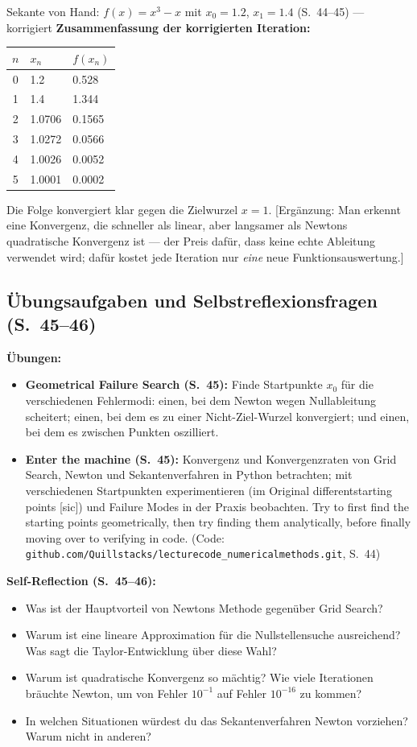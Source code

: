 \begin{bspbox}{Sekante von Hand: $f(x) = x^3 - x$ mit $x_0 = 1.2$, $x_1 = 1.4$ (S.~44--45) — korrigiert}
\textbf{Zusammenfassung der korrigierten Iteration:}
\begin{center}
\begin{tabular}{c l l}
\toprule
$n$ & $x_n$ & $f(x_n)$ \\
\midrule
0 & 1.2 & 0.528 \\
1 & 1.4 & 1.344 \\
2 & 1.0706 & 0.1565 \\
3 & 1.0272 & 0.0566 \\
4 & 1.0026 & 0.0052 \\
5 & 1.0001 & 0.0002 \\
\bottomrule
\end{tabular}
\end{center}
Die Folge konvergiert klar gegen die Zielwurzel $x = 1$. [Ergänzung: Man erkennt eine Konvergenz, die schneller als linear, aber langsamer als Newtons quadratische Konvergenz ist — der Preis dafür, dass keine echte Ableitung verwendet wird; dafür kostet jede Iteration nur \emph{eine} neue Funktionsauswertung.]
\end{bspbox}

\subsection{Übungsaufgaben und Selbstreflexionsfragen (S.~45--46)}
\textbf{Übungen:}
\begin{itemize}[nosep]
  \item \textbf{Geometrical Failure Search (S.~45):} Finde Startpunkte $x_0$ für die verschiedenen Fehlermodi: einen, bei dem Newton wegen Nullableitung scheitert; einen, bei dem es zu einer Nicht-Ziel-Wurzel konvergiert; und einen, bei dem es zwischen Punkten oszilliert.
  \item \textbf{Enter the machine (S.~45):} Konvergenz und Konvergenzraten von Grid Search, Newton und Sekantenverfahren in Python betrachten; mit verschiedenen Startpunkten experimentieren (im Original \glqq differentstarting points\grqq{} [sic]) und Failure Modes in der Praxis beobachten. \glqq Try to first find the starting points geometrically, then try finding them analytically, before finally moving over to verifying in code.\grqq{} (Code: \texttt{github.com/Quillstacks/lecturecode\_numericalmethods.git}, S.~44)
\end{itemize}
\textbf{Self-Reflection (S.~45--46):}
\begin{itemize}[nosep]
  \item Was ist der Hauptvorteil von Newtons Methode gegenüber Grid Search?
  \item Warum ist eine lineare Approximation für die Nullstellensuche ausreichend? Was sagt die Taylor-Entwicklung über diese Wahl?
  \item Warum ist quadratische Konvergenz so mächtig? Wie viele Iterationen bräuchte Newton, um von Fehler $10^{-1}$ auf Fehler $10^{-16}$ zu kommen?
  \item In welchen Situationen würdest du das Sekantenverfahren Newton vorziehen? Warum nicht in anderen?
\end{itemize}


